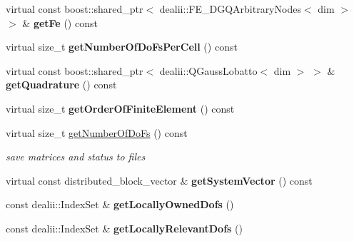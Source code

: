 \begin{DoxyCompactItemize}
\item 
\hypertarget{classnatrium_1_1SemiLagrangian_ab62cef51c3f415243da5b30061a32bdb}{
virtual const boost::shared\_\-ptr$<$ dealii::FE\_\-DGQArbitraryNodes$<$ dim $>$ $>$ \& {\bfseries getFe} () const }
\label{classnatrium_1_1SemiLagrangian_ab62cef51c3f415243da5b30061a32bdb}

\item 
\hypertarget{classnatrium_1_1SemiLagrangian_a51957acb7ab69735c985be65538878f6}{
virtual size\_\-t {\bfseries getNumberOfDoFsPerCell} () const }
\label{classnatrium_1_1SemiLagrangian_a51957acb7ab69735c985be65538878f6}

\item 
\hypertarget{classnatrium_1_1SemiLagrangian_a17d0d8e42f22eae8c55d754530636dce}{
virtual const boost::shared\_\-ptr$<$ dealii::QGaussLobatto$<$ dim $>$ $>$ \& {\bfseries getQuadrature} () const }
\label{classnatrium_1_1SemiLagrangian_a17d0d8e42f22eae8c55d754530636dce}

\item 
\hypertarget{classnatrium_1_1SemiLagrangian_aabf77e88390f4c6656d2c45cdc65cce8}{
virtual size\_\-t {\bfseries getOrderOfFiniteElement} () const }
\label{classnatrium_1_1SemiLagrangian_aabf77e88390f4c6656d2c45cdc65cce8}

\item 
virtual size\_\-t \hyperlink{classnatrium_1_1SemiLagrangian_aeb3b1dfda8a0d8fe7473716f98b12647}{getNumberOfDoFs} () const 
\begin{DoxyCompactList}\small\item\em save matrices and status to files \item\end{DoxyCompactList}\item 
\hypertarget{classnatrium_1_1SemiLagrangian_a730b721bc86a64418b2ae60fa888b3d4}{
virtual const distributed\_\-block\_\-vector \& {\bfseries getSystemVector} () const }
\label{classnatrium_1_1SemiLagrangian_a730b721bc86a64418b2ae60fa888b3d4}

\item 
\hypertarget{classnatrium_1_1SemiLagrangian_a5eea1ecde1da0e7aa81f4972037f5f01}{
const dealii::IndexSet \& {\bfseries getLocallyOwnedDofs} ()}
\label{classnatrium_1_1SemiLagrangian_a5eea1ecde1da0e7aa81f4972037f5f01}

\item 
\hypertarget{classnatrium_1_1SemiLagrangian_a17810c1590eb72c5449819f51fa6b4d7}{
const dealii::IndexSet \& {\bfseries getLocallyRelevantDofs} ()}
\label{classnatrium_1_1SemiLagrangian_a17810c1590eb72c5449819f51fa6b4d7}


\end{DoxyCompactItemize}

